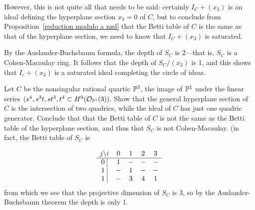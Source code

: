 \begin{example}
However, this is not quite all that needs to be said: certainly $I_{C}+(x_{3})$ is an ideal defining the hyperplane section $x_{3}= 0$ of $C$, but to conclude from  Proposition~\ref{reduction modulo a nzd} that the Betti table of $C$ is the same as that of the hyperplane section, we need to know that $I_{C}+(x_{3})$ is saturated.

By the Auslander-Buchsbaum formula, the depth of $S_{C}$ is 2---that is, $S_{C}$ is a Cohen-Macaulay ring. It follows that the depth of $S_{C}/(x_{3})$ is 1, and this shows that $I_{c}+(x_{3})$ is a saturated ideal completing the circle of ideas.
\end{example}

\begin{exercise}
 Let $C$ be the nonsingular rational quartic $\PP^{3}$, the image of $\PP^{1}$ under the linear series
 $(s^{4}, s^{3}t, st^{3}, t^{4}\subset H^{0}(\sO_{\PP^{1}}(3))$. Show that the general hyperplane section of $C$  is the intersection of two quadrics, while the ideal of $C$ has just one quadric generator. Conclude that
  that the Betti table of $C$ is not the same as the Betti table of the hyperplane section, and thus that
  $S_{C}$ is not Cohen-Macaulay. (in fact, the Betti table of $S_{C}$ is
\begin{small}
$$
\begin{matrix}
j \backslash i &0&1&2&3\\ \hline
\text{0 }\vline &1&-&-&-\\
\text{1 }\vline &-&1&-&-\\
\text{1 }\vline &-&3&4&1\\
\end{matrix}
$$
from which we see that the projective dimension of $S_{C}$ is 3, so by the Auslander-Buchsbaum theorem the depth is only 1.
\end{small}

\end{exercise}



